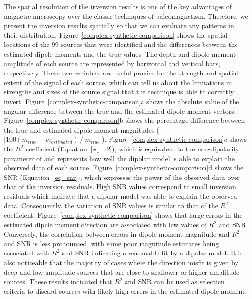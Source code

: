 The spatial resolution of the inversion results is one of the key advantages of magnetic microscopy over the classic techniques of paleomagnetism.
Therefore, we present the inversion results spatially so that we can evaluate any patterns in their distribution.
Figure~\ref{complex-synthetic-comparison} shows the spatial locations of the 99 sources that were identified and the differences between the estimated dipole moments and the true values.
The depth and dipole moment amplitude of each source are represented by horizontal and vertical bars, respectively.
These two variables are useful proxies for the strength and spatial extent of the signal of each source,
which can tell us about the limitations in strengths and sizes of the source signal that the technique is able to correctly invert.
Figure~\ref{complex-synthetic-comparison}a shows the absolute value of the angular difference between the true and the estimated dipole moment vectors.
Figure~\ref{complex-synthetic-comparison}b shows the percentage difference between the true and estimated dipole moment magnitudes ($|100 \left( m_{true} - m_{estimated}\right) ~/~ m_{true}|$).
Figure~\ref{complex-synthetic-comparison}c shows the $R^2$ coefficient (Equation~\ref{eq_r2}), which is equivalent to the non-dipolarity parameter of \citet{Fu2020} and represents how well the dipolar model is able to explain the observed data of each source.
Figure~\ref{complex-synthetic-comparison}d shows the SNR (Equation~\ref{eq_snr}), which expresses the power of the observed data over that of the inversion residuals.
High SNR values correspond to small inversion residuals which indicate that a dipolar model was able to explain the observed data.
Consequently, the variation of SNR values is similar to that of the $R^2$ coefficient.
Figure~\ref{complex-synthetic-comparison} shows that large errors in the estimated dipole moment direction are associated with low values of $R^2$ and SNR.
Conversely, the correlation between errors in dipole moment magnitude and $R^2$ and SNR is less pronounced, with some poor magnitude estimates being associated with $R^2$ and SNR indicating a reasonable fit by a dipolar model.
It is also noticeable that the majority of cases where the direction misfit is given by deep and low-amplitude sources that are close to shallower or higher-amplitude sources.
These results indicated that $R^2$ and SNR can be used as selection criteria to discard sources with likely high errors in the estimated dipole moment.

